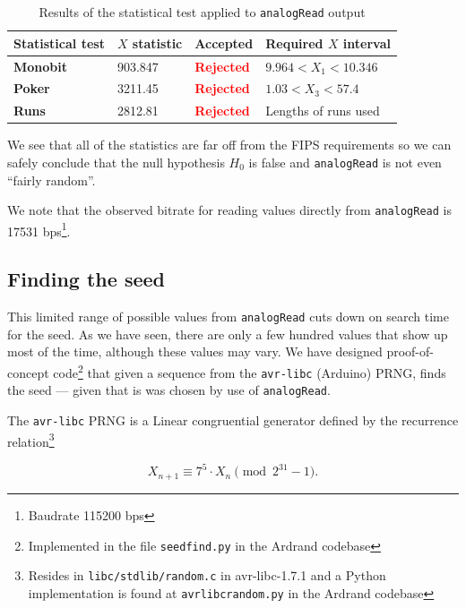 \documentclass[a4paper]{article}           %
\begin{document}
  \begin{table}[H]
    \begin{center}
      \begin{tabular}{| l | l | l | l |}
        \hline
        Statistical test & $X$ statistic & Accepted & Required $X$ interval \\
        \hline
        \hline
        \textbf{Monobit} & 903.847 & \textcolor{red}{\textbf{Rejected}} & $9.964 < X_1 < 10.346$  \\
        \textbf{Poker} & 3211.45 & \textcolor{red}{\textbf{Rejected}} & $1.03 < X_3 < 57.4$ \\
        \textbf{Runs} & 2812.81 & \textcolor{red}{\textbf{Rejected}} & Lengths of runs used \\
        \hline
      \end{tabular}
    \end{center}
    \caption{Results of the statistical test applied to \texttt{analogRead} output}
    \label{tab:analogreadtests}
  \end{table}

We see that all of the statistics are far off from the FIPS requirements so we can safely conclude that the null hypothesis $H_0$ is false and \texttt{analogRead} is not even ``fairly random''. 

We note that the observed bitrate for reading values directly from \texttt{analogRead} is 17531 bps\footnote{Baudrate 115200 bps}. 

\subsection{Finding the seed}
\label{sec:seedfind}

This limited range of possible values from \texttt{analogRead} cuts down on search time for the seed. As we have seen, there are only a few hundred values that show up most of the time, although these values may vary. We have designed proof-of-concept code\footnote{Implemented in the file \texttt{seedfind.py} in the Ardrand codebase} that given a sequence from the \texttt{avr-libc} (Arduino) PRNG, finds the seed --- given that is was chosen by use of \texttt{analogRead}. 

The \texttt{avr-libc} PRNG is a Linear congruential generator defined by the recurrence relation\footnote{Resides in \texttt{libc/stdlib/random.c} in avr-libc-1.7.1 and a Python implementation is found at \texttt{avrlibcrandom.py} in the Ardrand codebase}

\[
X_{n+1} \equiv 7^5 \cdot X_n \pmod{2^{31} -1}.
\]
\end{document}
